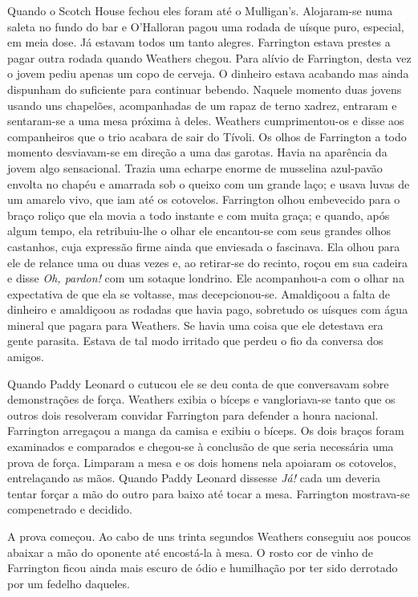 Quando o Scotch House fechou eles foram até o Mulligan’s.  Alojaram-se numa
saleta no fundo do bar e O’Halloran pagou uma rodada de uísque puro, especial,
em meia dose.  Já estavam todos um tanto alegres.  Farrington estava prestes a
pagar outra rodada quando Weathers chegou.  Para alívio de Farrington, desta
vez o jovem pediu apenas um copo de cerveja.  O dinheiro estava acabando mas
ainda dispunham do suficiente para continuar bebendo.  Naquele momento duas
jovens usando uns chapelões, acompanhadas de um rapaz de terno xadrez, entraram
e sentaram-se a uma mesa próxima à deles.  Weathers cumprimentou-os e disse aos
companheiros que o trio acabara de sair do Tívoli.  Os olhos de Farrington a
todo momento desviavam-se em direção a uma das garotas.  Havia na aparência da
jovem algo sensacional.  Trazia uma echarpe enorme de musselina azul-pavão
envolta no chapéu e amarrada sob o queixo com um grande laço; e usava luvas de
um amarelo vivo, que iam até os cotovelos.  Farrington olhou embevecido para o
braço roliço que ela movia a todo instante e com muita graça; e quando, após
algum tempo, ela retribuiu-lhe o olhar ele encantou-se com seus grandes olhos
castanhos, cuja expressão firme ainda que enviesada o fascinava.  Ela olhou
para ele de relance uma ou duas vezes e, ao retirar-se do recinto, roçou em sua
cadeira e disse \textit{Oh, pardon!} com um sotaque londrino.  Ele acompanhou-a
com o olhar na expectativa de que ela se voltasse, mas decepcionou-se.
Amaldiçoou a falta de dinheiro e amaldiçoou as rodadas que havia pago,
sobretudo os uísques com água mineral que pagara para Weathers.  Se havia uma
coisa que ele detestava era gente parasita.  Estava de tal modo irritado que
perdeu o fio da conversa dos amigos.

Quando Paddy Leonard o cutucou ele se deu conta de que conversavam sobre
demonstrações de força.  Weathers exibia o bíceps e vangloriava-se tanto que os
outros dois resolveram convidar Farrington para defender a honra nacional.
Farrington arregaçou a manga da camisa e exibiu o bíceps.  Os dois braços foram
examinados e comparados e chegou-se à conclusão de que seria necessária uma
prova de força.  Limparam a mesa e os dois homens nela apoiaram os cotovelos,
entrelaçando as mãos.  Quando Paddy Leonard dissesse \textit{Já!} cada um
deveria tentar forçar a mão do outro para baixo até tocar a mesa.  Farrington
mostrava-se compenetrado e decidido.

A prova começou.  Ao cabo de uns trinta segundos Weathers conseguiu aos poucos
abaixar a mão do oponente até encostá-la à mesa.  O rosto cor de vinho de
Farrington ficou ainda mais escuro de ódio e humilhação por ter sido derrotado
por um fedelho daqueles.

